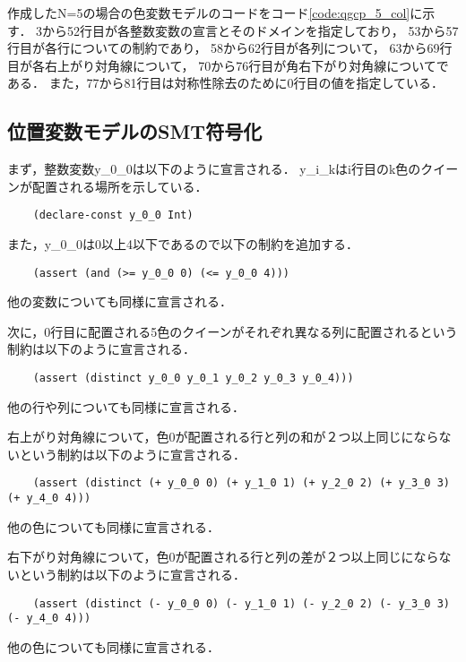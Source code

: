 作成したN=5の場合の色変数モデルのコードをコード\ref{code:qgcp_5_col}に示す．
3から52行目が各整数変数の宣言とそのドメインを指定しており，
53から57行目が各行についての制約であり，
58から62行目が各列について，
63から69行目が各右上がり対角線について，
70から76行目が角右下がり対角線についてである．
また，77から81行目は対称性除去のために0行目の値を指定している．




\subsection{位置変数モデルのSMT符号化}
まず，整数変数y\_0\_0は以下のように宣言される．
y\_i\_kはi行目のk色のクイーンが配置される場所を示している．
{ \footnotesize \begin{verbatim}
    (declare-const y_0_0 Int)
\end{verbatim}}
また，y\_0\_0は0以上4以下であるので以下の制約を追加する．
{ \footnotesize \begin{verbatim}
    (assert (and (>= y_0_0 0) (<= y_0_0 4)))
\end{verbatim}}
他の変数についても同様に宣言される．

次に，0行目に配置される5色のクイーンがそれぞれ異なる列に配置されるという制約は以下のように宣言される．
{ \footnotesize \begin{verbatim}
    (assert (distinct y_0_0 y_0_1 y_0_2 y_0_3 y_0_4)))
\end{verbatim}}
他の行や列についても同様に宣言される．

右上がり対角線について，色0が配置される行と列の和が２つ以上同じにならないという制約は以下のように宣言される．
{ \footnotesize \begin{verbatim}
    (assert (distinct (+ y_0_0 0) (+ y_1_0 1) (+ y_2_0 2) (+ y_3_0 3) (+ y_4_0 4)))
\end{verbatim}}
他の色についても同様に宣言される．

右下がり対角線について，色0が配置される行と列の差が２つ以上同じにならないという制約は以下のように宣言される．
{ \footnotesize \begin{verbatim}
    (assert (distinct (- y_0_0 0) (- y_1_0 1) (- y_2_0 2) (- y_3_0 3) (- y_4_0 4)))
\end{verbatim}}
他の色についても同様に宣言される．


